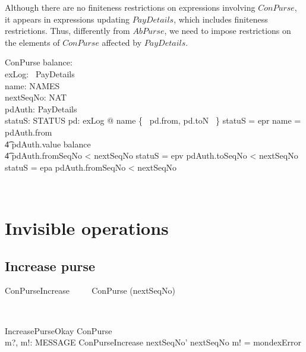 Although there are no finiteness restrictions
on expressions involving $ConPurse$, it appears in expressions
updating $PayDetails$, which includes finiteness restrictions.
Thus, differently from $AbPurse$, we need to impose restrictions
on the elements of $ConPurse$ affected by $PayDetails$.
%
\begin{LSDef}
\begin{schema}{ConPurse}
   balance: \nat \\
   exLog: \power~PayDetails \\
   name: NAMES \\
   nextSeqNo: NAT \\
   pdAuth: PayDetails \\
   statuS: STATUS
\where
   \forall pd: exLog @ name \in \{~ pd.from, pd.toN ~\}
   \also
   statuS = epr \implies name = pdAuth.from \\
                \t4 \land pdAuth.value \leq balance \\
                \t4 \land pdAuth.fromSeqNo < nextSeqNo
   \also
   statuS = epv \implies pdAuth.toSeqNo < nextSeqNo
   \also
   statuS = epa \implies pdAuth.fromSeqNo < nextSeqNo
\end{schema}~\end{LSDef}

\section{Invisible operations}

\subsection{Increase purse}

\begin{LSDef}
\begin{zed}
   ConPurseIncrease ~~~~ ConPurse \hide (nextSeqNo)
\end{zed}~\end{LSDef}

\begin{LSDef}
\begin{schema}{IncreasePurseOkay}
   \Delta ConPurse \\
   m?, m!: MESSAGE
\where
  \Xi ConPurseIncrease
  \also
  nextSeqNo' \geq nextSeqNo
  \also
  m! = mondexError
\end{schema}~\end{LSDef}

